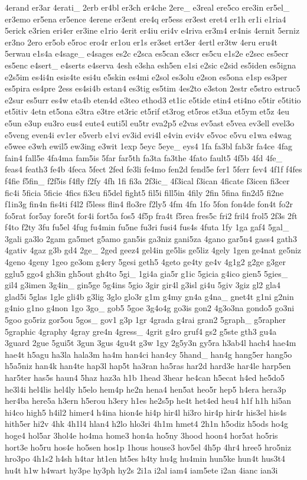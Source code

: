 {4erand er3ar 4erati\-\_\- 2erb er4bl er3ch er4che 2ere\-\_\- e3real ere5co ere3in er5el\-\_\- er3emo er5ena er5ence 4erene er3ent ere4q er5ess er3est eret4 er1h er1i e1ria4 5erick e3rien eri4er er3ine e1rio 4erit er4iu eri4v e4riva er3m4 er4nis 4ernit 5erniz er3no 2ero er5ob e5roc ero4r er1ou er1s er3set ert3er 4ertl er3tw 4eru eru4t 5erwau e1s4a e4sage\-\_\- e4sages es2c e2sca es5can e3scr es5cu e1s2e e2sec es5ecr es5enc e4sert\-\_\- e4serts e4serva 4esh e3sha esh5en e1si e2sic e2sid es5iden es5igna e2s5im es4i4n esis4te esi4u e5skin es4mi e2sol es3olu e2son es5ona e1sp es3per es5pira es4pre 2ess es4si4b estan4 es3tig es5tim 4es2to e3ston 2estr e5stro estruc5 e2sur es5urr es4w eta4b eten4d e3teo ethod3 et1ic e5tide etin4 eti4no e5tir e5titio et5itiv 4etn et5ona e3tra e3tre et3ric et5rif et3rog et5ros et3ua et5ym et5z 4eu e5un e3up eu3ro eus4 eute4 euti5l eu5tr eva2p5 e2vas ev5ast e5vea ev3ell evel3o e5veng even4i ev1er e5verb e1vi ev3id evi4l e4vin evi4v e5voc e5vu e1wa e4wag e5wee e3wh ewil5 ew3ing e3wit 1exp 5eyc 5eye\-\_\- eys4 1fa fa3bl fab3r fa4ce 4fag fain4 fall5e 4fa4ma fam5is 5far far5th fa3ta fa3the 4fato fault5 4f5b 4fd 4fe\-\_\- feas4 feath3 fe4b 4feca 5fect 2fed fe3li fe4mo fen2d fend5e fer1 5ferr fev4 4f1f f4fes f4fie f5fin\-\_\- f2f5is f4fly f2fy 4fh 1fi fi3a 2f3ic\-\_\- 4f3ical f3ican 4ficate f3icen fi3cer fic4i 5ficia 5ficie 4fics fi3cu fi5del fight5 fil5i fill5in 4fily 2fin 5fina fin2d5 fi2ne f1in3g fin4n fis4ti f4l2 f5less flin4 flo3re f2ly5 4fm 4fn 1fo 5fon fon4de fon4t fo2r fo5rat for5ay fore5t for4i fort5a fos5 4f5p fra4t f5rea fres5c fri2 fril4 frol5 2f3s 2ft f4to f2ty 3fu fu5el 4fug fu4min fu5ne fu3ri fusi4 fus4s 4futa 1fy 1ga gaf4 5gal\-\_\- 3gali ga3lo 2gam ga5met g5amo gan5is ga3niz gani5za 4gano gar5n4 gass4 gath3 4gativ 4gaz g3b gd4 2ge\-\_\- 2ged geez4 gel4in ge5lis ge5liz 4gely 1gen ge4nat ge5niz 4geno 4geny 1geo ge3om g4ery 5gesi geth5 4geto ge4ty ge4v 4g1g2 g2ge g3ger gglu5 ggo4 gh3in gh5out gh4to 5gi\-\_\- 1gi4a gia5r g1ic 5gicia g4ico gien5 5gies\-\_\- gil4 g3imen 3g4in\-\_\- gin5ge 5g4ins 5gio 3gir gir4l g3isl gi4u 5giv 3giz gl2 gla4 glad5i 5glas 1gle gli4b g3lig 3glo glo3r g1m g4my gn4a g4na\-\_\- gnet4t g1ni g2nin g4nio g1no g4non 1go 3go\-\_\- gob5 5goe 3g4o4g go3is gon2 4g3o3na gondo5 go3ni 5goo go5riz gor5ou 5gos\-\_\- gov1 g3p 1gr 4grada g4rai gran2 5graph\-\_\- g5rapher 5graphic 4graphy 4gray gre4n 4gress\-\_\- 4grit g4ro gruf4 gs2 g5ste gth3 gu4a 3guard 2gue 5gui5t 3gun 3gus 4gu4t g3w 1gy 2g5y3n gy5ra h3ab4l hach4 hae4m hae4t h5agu ha3la hala3m ha4m han4ci han4cy 5hand\-\_\- han4g hang5er hang5o h5a5niz han4k han4te hap3l hap5t ha3ran ha5ras har2d hard3e har4le harp5en har5ter has5s haun4 5haz haz3a h1b 1head 3hear he4can h5ecat h4ed he5do5 he3l4i hel4lis hel4ly h5elo hem4p he2n hena4 hen5at heo5r hep5 h4era hera3p her4ba here5a h3ern h5erou h3ery h1es he2s5p he4t het4ed heu4 h1f h1h hi5an hi4co high5 h4il2 himer4 h4ina hion4e hi4p hir4l hi3ro hir4p hir4r his3el his4s hith5er hi2v 4hk 4h1l4 hlan4 h2lo hlo3ri 4h1m hmet4 2h1n h5odiz h5ods ho4g hoge4 hol5ar 3hol4e ho4ma home3 hon4a ho5ny 3hood hoon4 hor5at ho5ris hort3e ho5ru hos4e ho5sen hos1p 1hous house3 hov5el 4h5p 4hr4 hree5 hro5niz hro3po 4h1s2 h4sh h4tar ht1en ht5es h4ty hu4g hu4min hun5ke hun4t hus3t4 hu4t h1w h4wart hy3pe hy3ph hy2s 2i1a i2al iam4 iam5ete i2an 4ianc ian3i }

